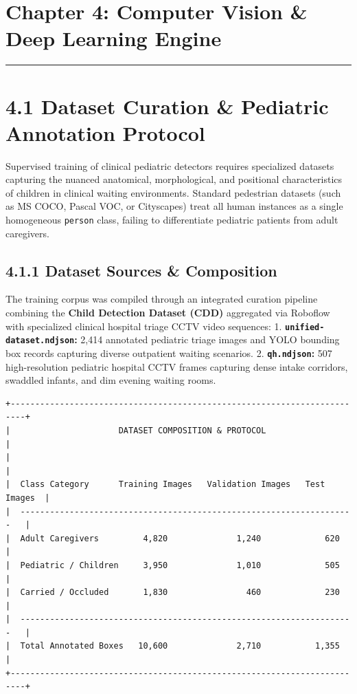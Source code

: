 \section{Chapter 4: Computer Vision \& Deep Learning
Engine}\label{chapter-4-computer-vision-deep-learning-engine}

\begin{center}\rule{0.5\linewidth}{0.5pt}\end{center}

\section{4.1 Dataset Curation \& Pediatric Annotation
Protocol}\label{dataset-curation-pediatric-annotation-protocol}

Supervised training of clinical pediatric detectors requires specialized
datasets capturing the nuanced anatomical, morphological, and positional
characteristics of children in clinical waiting environments. Standard
pedestrian datasets (such as MS COCO, Pascal VOC, or Cityscapes) treat
all human instances as a single homogeneous \texttt{person} class,
failing to differentiate pediatric patients from adult caregivers.

\subsection{4.1.1 Dataset Sources \&
Composition}\label{dataset-sources-composition}

The training corpus was compiled through an integrated curation pipeline
combining the \textbf{Child Detection Dataset (CDD)} aggregated via
Roboflow with specialized clinical hospital triage CCTV video sequences:
1. \textbf{\texttt{unified-dataset.ndjson}:} 2,414 annotated pediatric
triage images and YOLO bounding box records capturing diverse outpatient
waiting scenarios. 2. \textbf{\texttt{qh.ndjson}:} 507 high-resolution
pediatric hospital CCTV frames capturing dense intake corridors,
swaddled infants, and dim evening waiting rooms.

\begin{verbatim}
+-------------------------------------------------------------------------+
|                      DATASET COMPOSITION & PROTOCOL                     |
|                                                                         |
|  Class Category      Training Images   Validation Images   Test Images  |
|  --------------------------------------------------------------------   |
|  Adult Caregivers         4,820              1,240             620      |
|  Pediatric / Children     3,950              1,010             505      |
|  Carried / Occluded       1,830                460             230      |
|  --------------------------------------------------------------------   |
|  Total Annotated Boxes   10,600              2,710           1,355      |
+-------------------------------------------------------------------------+
\end{verbatim}

